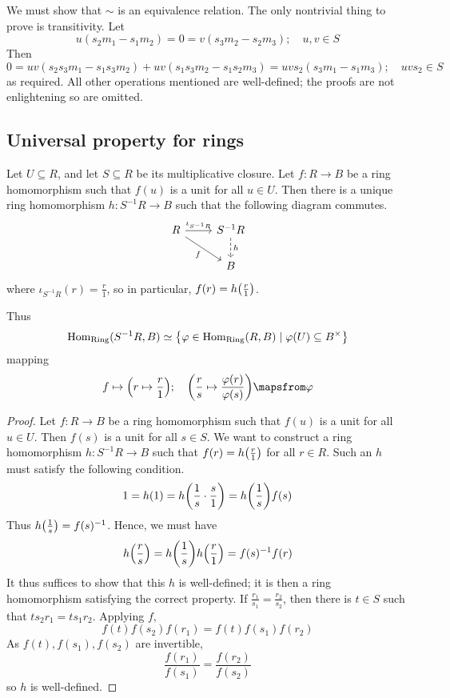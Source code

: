We must show that \( \sim \) is an equivalence relation.
The only nontrivial thing to prove is transitivity.
Let
\[ u(s_2 m_1 - s_1 m_2) = 0 = v(s_3 m_2 - s_2 m_3);\quad u, v \in S \]
Then
\[ 0 = uv(s_2 s_3 m_1 - s_1 s_3 m_2) + uv(s_1 s_3 m_2 - s_1 s_2 m_3) = uvs_2(s_3 m_1 - s_1 m_3);\quad uvs_2 \in S \]
as required.
All other operations mentioned are well-defined; the proofs are not enlightening so are omitted.

\subsection{Universal property for rings}
\begin{proposition}
    Let \( U \subseteq R \), and let \( S \subseteq R \) be its multiplicative closure.
    Let \( f : R \to B \) be a ring homomorphism such that \( f(u) \) is a unit for all \( u \in U \).
    Then there is a unique ring homomorphism \( h : S^{-1}R \to B \) such that the following diagram commutes.
    \[\begin{tikzcd}
        R & {S^{-1}R} \\
        & B
        \arrow["{\iota_{S^{-1}R}}", from=1-1, to=1-2]
        \arrow["h", dashed, from=1-2, to=2-2]
        \arrow["f"', from=1-1, to=2-2]
    \end{tikzcd}\]
    where \( \iota_{S^{-1}R}(r) = \frac{r}{1} \), so in particular, \( f(r) = h\qty(\frac{r}{1}) \).
\end{proposition}
Thus
\[ \operatorname{Hom}_{\text{Ring}}(S^{-1}R, B) \simeq \qty{\varphi \in \operatorname{Hom}_{\text{Ring}}(R, B) \mid \varphi(U) \subseteq B^\times} \]
mapping
\[ f \mapsto \qty(r \mapsto \frac{r}{1});\quad \qty(\frac{r}{s} \mapsto \frac{\varphi(r)}{\varphi(s)}) \mapsfrom \varphi \]
\begin{proof}
    Let \( f : R \to B \) be a ring homomorphism such that \( f(u) \) is a unit for all \( u \in U \).
    Then \( f(s) \) is a unit for all \( s \in S \).
    We want to construct a ring homomorphism \( h : S^{-1}R \to B \) such that \( f(r) = h\qty(\frac{r}{1}) \) for all \( r \in R \).
    Such an \( h \) must satisfy the following condition.
    \[ 1 = h(1) = h\qty(\frac{1}{s} \cdot \frac{s}{1}) = h\qty(\frac{1}{s}) f(s) \]
    Thus \( h\qty(\frac{1}{s}) = f(s)^{-1} \).
    Hence, we must have
    \[ h\qty(\frac{r}{s}) = h\qty(\frac{1}{s}) h\qty(\frac{r}{1}) = f(s)^{-1} f(r) \]
    It thus suffices to show that this \( h \) is well-defined; it is then a ring homomorphism satisfying the correct property.
    If \( \frac{r_1}{s_1} = \frac{r_2}{s_2} \), then there is \( t \in S \) such that \( t s_2 r_1 = t s_1 r_2 \).
    Applying \( f \),
    \[ f(t) f(s_2) f(r_1) = f(t) f(s_1) f(r_2) \]
    As \( f(t), f(s_1), f(s_2) \) are invertible,
    \[ \frac{f(r_1)}{f(s_1)} = \frac{f(r_2)}{f(s_2)} \]
    so \( h \) is well-defined.
\end{proof}
